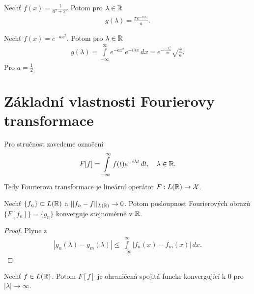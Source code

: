 \begin{priklad}
Nechť $f(x)=\frac{1}{a^2+x^2}$ Potom pro $\lambda \in \mathbb{R}$
\begin{align*}
g(\lambda)= \frac{\pi e^{-a|\lambda|}}{a}.
\end{align*}
\end{priklad}

\begin{priklad}
Nechť $f(x)=e^{-ax^2}$. Potom pro $\lambda \in \mathbb{R}$
\begin{align*}
g(\lambda)= \int \limits _{-\infty}^{\infty} e^{-ax^2}e^{-i\lambda x} \, dx = e^{-\frac{-\lambda^2}{4a}} \sqrt{\frac{\pi}{a}}.
\end{align*}
Pro $a=\frac{1}{2}$
\end{priklad}

\section{Základní vlastnosti Fourierovy transformace}

Pro stručnost zavedeme označení 
\begin{align*}
F[f]=\int \limits _{-\infty}^{\infty} f(t) e^{-i \lambda t} \, dt, \quad \lambda \in \mathbb{R}.
\end{align*}
Tedy Fourierova transformace je lineární operátor $F:L(\mathbb{R}) \to \mathcal{X}$.

\begin{tvrz}\label{t_6.8}
Nechť $\{f_n\} \subset L(\mathbb{R})$ a $||f_n-f||_{L(\mathbb{R})} \to 0$. Potom posloupnost Fourierových obraz\r u $\{F[f_n]\}=\{g_n\}$ konverguje stejnoměrně v $\mathbb{R}$.
\end{tvrz}

\begin{proof}
Plyne z 
\begin{align*}
|g_n(\lambda)-g_m(\lambda)| \leq \int \limits _{-\infty}^{\infty} |f_n(x)-f_m(x)| \, dx.
\end{align*}
\end{proof}

\begin{tvrz}\label{t_6.9}
Nechť $f \in L(\mathbb{R})$. Potom $F[f]$ je ohraničená spojitá funcke konvergující k $0$ pro $|\lambda| \to \infty$.
\end{tvrz}

